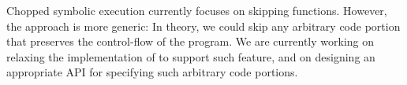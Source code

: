 Chopped symbolic execution currently focuses on skipping functions.
However, the approach is more generic: In theory, we could skip any
arbitrary code portion that preserves the control-flow of the
program. We are currently working on relaxing the implementation of
\toolname to support such feature, and on designing an appropriate API
for specifying such arbitrary code portions.


